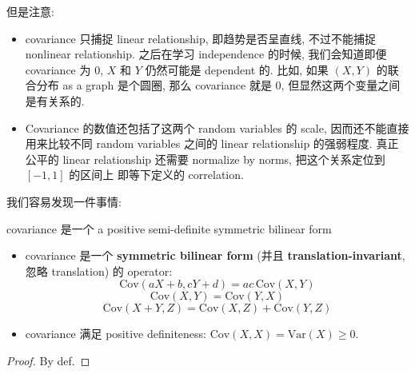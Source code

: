 \begin{remark}
\begin{center}
\end{center}
但是注意:
\begin{itemize}
    \item covariance 只捕捉 linear relationship, 即趋势是否呈直线,
不过不能捕捉 nonlinear relationship. 之后在学习 independence 的时候, 
我们会知道即便 covariance 为 0, \(X\) 和 \(Y\) 仍然可能是 dependent 的.
比如, 如果 \((X,Y)\) 的联合分布 as a graph 是个圆圈, 那么 covariance 
就是 0, 但显然这两个变量之间是有关系的.
\begin{center}
\end{center}

\item Covariance 的数值还包括了这两个 random variables 的 scale,
  因而还不能直接用来比较不同 random variables
  之间的 linear relationship 的强弱程度. 真正公平的 
  linear relationship 还需要 normalize by norms,
  把这个关系定位到 $[-1,1]$ 的区间上 即等下定义的 correlation.
\end{itemize}
 
\end{remark}


我们容易发现一件事情:
\begin{theorem}{covariance 是一个 a positive semi-definite symmetric bilinear form}
\begin{itemize}
\item covariance 是一个 \textbf{symmetric bilinear form }(并且 \textbf{translation-invariant}, 忽略 translation) 的 operator: 
    \[\text{Cov}(aX+b, cY+d) = ac \, \text{Cov}(X,Y) \]
    \[\text{Cov}(X,Y) = \text{Cov}(Y,X)\]
    \[\text{Cov}(X+Y, Z) = \text{Cov}(X, Z) + \text{Cov}(Y, Z)\]
    \item covariance 满足 positive definiteness: \(\text{Cov}(X,X) = \text{Var}(X) \geq 0\).
\end{itemize}
\end{theorem}
\begin{proof}
By def.
\end{proof}

